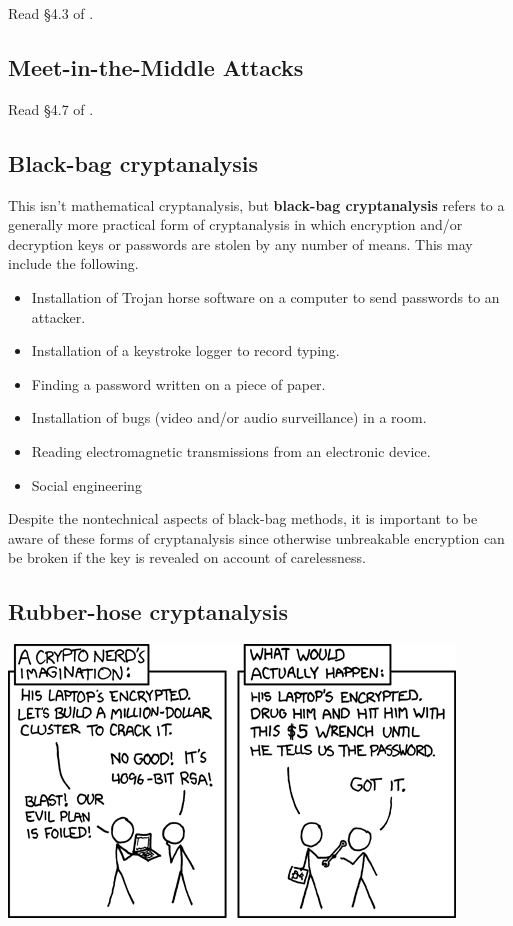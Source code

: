 		Read \S 4.3  of \cite{tw}.

		\subsection{Meet-in-the-Middle Attacks}
		\label{sssec:mitm}

		Read \S 4.7 of \cite{tw}.

		\subsection{Black-bag cryptanalysis}

			This isn't mathematical cryptanalysis, but {\bf black-bag cryptanalysis}  refers to a generally more practical form of cryptanalysis in which encryption and/or decryption keys or passwords are stolen by any number of means. This may include the following.
		\begin{itemize}
			\item Installation of Trojan horse software on a computer to send passwords to an attacker.
			\item Installation of a keystroke logger to record typing.
			\item Finding a password written on a piece of paper.
			\item Installation of bugs (video and/or audio surveillance) in a room.
			\item Reading electromagnetic transmissions from an electronic device.
			\item Social engineering
		\end{itemize}
		Despite the nontechnical aspects of black-bag methods, it is important to be aware of these forms of cryptanalysis since otherwise unbreakable encryption can be broken if the key is revealed on account of carelessness.

		\subsection{Rubber-hose cryptanalysis}

\begin{center}
\includegraphics{img/security-xkcd.png}
\end{center}

